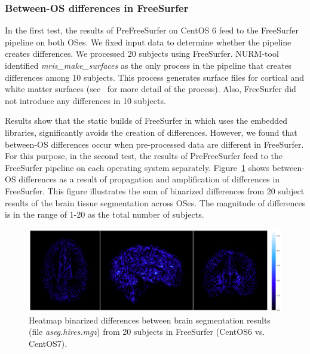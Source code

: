 \documentclass[a4paper,num-refs]{oup-contemporary}
\begin{document}
\subsubsection{Between-OS differences in FreeSurfer} 

In the first test, the results of PreFreeSurfer on CentOS 6
feed to the FreeSurfer pipeline on both OSes. 
We fixed input data to determine whether the pipeline creates differences.
We processed 20 subjects using FreeSurfer.
NURM-tool identified \emph{mris\_make\_surfaces} as the only process in 
the pipeline that creates differences among 10 subjects.
This process generates surface files for cortical and white matter surfaces 
(see~\cite{fischl2012freesurfer} for more detail of the process). 
Also, FreeSurfer did not introduce any differences in 10 subjects. 

Results show that the static builds of FreeSurfer in which uses the embedded libraries, 
significantly avoids the creation of differences.
However, we found that between-OS differences occur when pre-processed data are different in FreeSurfer. 
For this purpose, in the second test, the results of PreFreeSurfer feed to the FreeSurfer 
pipeline on each operating system separately.
Figure~\ref{fig:tissue_class} shows between-OS differences  
as a result of propagation and amplification of differences in FreeSurfer. %
This figure illustrates the sum of binarized differences 
from 20 subject results of the brain tissue segmentation across OSes.
The magnitude of differences is in the range of 1-20 as the total number of subjects.

\begin{figure}
\centering
  \includegraphics[width=\columnwidth]{images/brain_classification.png} 
  \caption{Heatmap binarized differences between brain segmentation results (file \emph{aseg.hires.mgz}) from 
          20 subjects in FreeSurfer (CentOS6 vs. CentOS7).} 
  \label{fig:tissue_class}
\end{figure}
\end{document}
